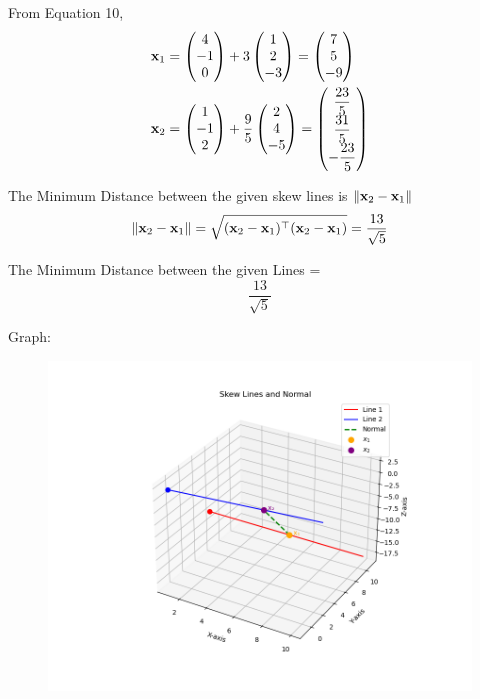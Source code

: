 \documentclass{beamer}
\begin{document}
From Equation 10,
\begin{align}
\mathbf{x}_1 &= \begin{pmatrix}4 \\ -1 \\ 0\end{pmatrix} + 3\begin{pmatrix}1 \\ 2 \\ -3\end{pmatrix} = \begin{pmatrix}7 \\ 5 \\ -9\end{pmatrix} \\
\mathbf{x}_2 &= \begin{pmatrix}1 \\ -1 \\ 2\end{pmatrix} + \dfrac{9}{5}\begin{pmatrix}2 \\ 4 \\ -5\end{pmatrix} = \begin{pmatrix}\dfrac{23}{5} \\ \dfrac{31}{5} \\ -\dfrac{23}{5}\end{pmatrix}
\end{align}

The Minimum Distance between the given skew lines is $\left\lVert\mathbf{x}_2 - \mathbf{x}_1\right\rVert$\\
\begin{align}
\left\lVert\mathbf{x}_2 - \mathbf{x}_1\right\rVert = \sqrt{(\mathbf{x}_2 - \mathbf{x}_1)^\top (\mathbf{x}_2 - \mathbf{x}_1)} = \dfrac{13}{\sqrt{5}}
\end{align}

The Minimum Distance between the given Lines = $$\dfrac{13}{\sqrt{5}} $$
\newline

Graph:
\begin{figure}[H]
    \centering
    \includegraphics[scale=0.5]{plot}
    \caption{}
    \label{fig:plot}
\end{figure}
\end{document}
